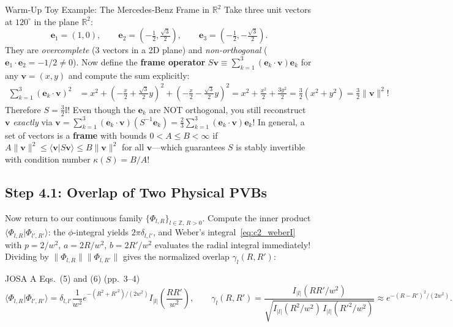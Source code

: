 \documentclass[10pt,letterpaper]{article}
\newcommand{\braket}[2]{\langle #1 | #2 \rangle}
\newcommand{\norm}[1]{\lVert #1 \rVert}
\newcommand{\abs}[1]{\lvert #1 \rvert}
\numberwithin{equation}{section}
\begin{document}
\begin{foundationbox}{Warm-Up Toy Example: The Mercedes-Benz Frame in $\mathbb{R}^2$}
Take three unit vectors at $120^\circ$ in the plane $\mathbb{R}^2$:
\[
  \mathbf{e}_1 = (1, 0), \qquad \mathbf{e}_2 = \left(-\tfrac{1}{2}, \tfrac{\sqrt{3}}{2}\right), \qquad \mathbf{e}_3 = \left(-\tfrac{1}{2}, -\tfrac{\sqrt{3}}{2}\right).
\]
They are \emph{overcomplete} (3 vectors in a 2D plane) and \emph{non-orthogonal} ($\mathbf{e}_1\cdot\mathbf{e}_2 = -1/2 \neq 0$). Now define the \textbf{frame operator} $S\mathbf{v} \equiv \sum_{k=1}^3 (\mathbf{e}_k\cdot\mathbf{v})\mathbf{e}_k$ for any $\mathbf{v} = (x,y)$ and compute the sum explicitly:
\begin{align*}
  \sum_{k=1}^3 (\mathbf{e}_k\cdot\mathbf{v})^2 &= x^2 + \left(-\frac{x}{2} + \frac{\sqrt{3}}{2}y\right)^2 + \left(-\frac{x}{2} - \frac{\sqrt{3}}{2}y\right)^2 = x^2 + \frac{x^2}{2} + \frac{3y^2}{2} = \frac{3}{2}(x^2 + y^2) = \frac{3}{2}\norm{\mathbf{v}}^2!
\end{align*}
Therefore $S = \frac{3}{2}\mathbb{I}$! Even though the $\mathbf{e}_k$ are NOT orthogonal, you still reconstruct $\mathbf{v}$ \emph{exactly} via $\mathbf{v} = \sum_{k=1}^3 (\mathbf{e}_k\cdot\mathbf{v})(S^{-1}\mathbf{e}_k) = \frac{2}{3}\sum_{k=1}^3 (\mathbf{e}_k\cdot\mathbf{v})\mathbf{e}_k$! In general, a set of vectors is a \textbf{frame} with bounds $0 < A \le B < \infty$ if $A\norm{\mathbf{v}}^2 \le \braket{\mathbf{v}}{S\mathbf{v}} \le B\norm{\mathbf{v}}^2$ for all $\mathbf{v}$---which guarantees $S$ is stably invertible with condition number $\kappa(S) = B/A$!
\end{foundationbox}

\subsection{Step 4.1: Overlap of Two Physical PVBs}

Now return to our continuous family $\{\Phi_{l,R}\}_{l\in\mathbb{Z},\, R>0}$. Compute the inner product $\braket{\Phi_{l,R}}{\Phi_{l',R'}}$: the $\phi$-integral yields $2\pi\delta_{l,l'}$, and Weber's integral~\eqref{eq:c2_weberI} with $p = 2/w^2$, $a = 2R/w^2$, $b = 2R'/w^2$ evaluates the radial integral immediately! Dividing by $\norm{\Phi_{l,R}}\norm{\Phi_{l,R'}}$ gives the normalized overlap $\gamma_l(R,R')$:

\begin{paperhit}{JOSA A Eqs.~(5) and (6) (pp.~3--4)}
\[
  \braket{\Phi_{l,R}}{\Phi_{l',R'}} = \delta_{l,l'}\frac{1}{w^2}e^{-(R^2+R'^2)/(2w^2)} I_{\abs{l}}\!\left(\frac{RR'}{w^2}\right), \qquad
  \gamma_l(R,R') = \frac{I_{\abs{l}}(RR'/w^2)}{\sqrt{I_{\abs{l}}(R^2/w^2)\,I_{\abs{l}}(R'^2/w^2)}} \approx e^{-(R-R')^2/(2w^2)}.
\]
\end{paperhit}
\end{document}
